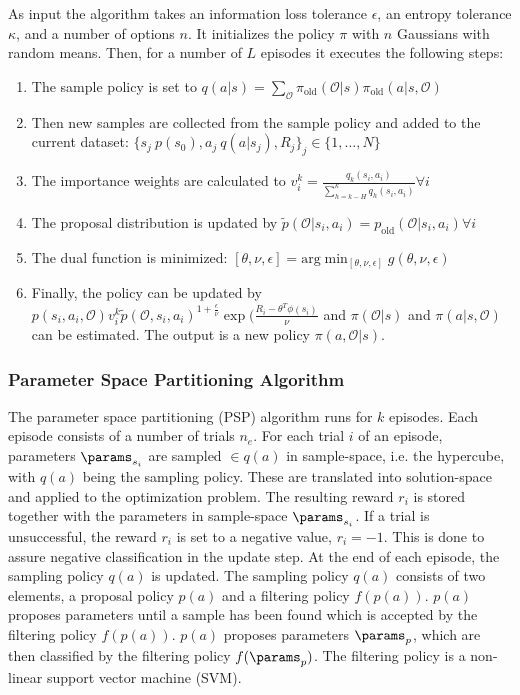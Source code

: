 As input the algorithm takes an information loss tolerance $\epsilon$, an entropy tolerance $\kappa$, and a number of options $n$.
It initializes the policy $\pi$ with $n$ Gaussians with random means.
Then, for a number of $L$ episodes it executes the following steps:
\begin{enumerate}
\item The sample policy is set to $q(a|s)=\sum_\mathcal{O} \pi_\text{old}(\mathcal{O}|s)\pi_\text{old}(a|s,\mathcal{O})$
\item Then new samples are collected from the sample policy and added to the current dataset: $\{s_j ~ p(s_0),a_j~q(a|s_j),R_j\}_j\in \{1,\dots,N\}$
\item The importance weights are calculated to $v_i^k=\frac{q_k(s_i,a_i)}{\sum_{h=k-H}^k q_h(s_i,a_i)} \forall i$
\item The proposal distribution is updated by $\tilde{p}(\mathcal{O}|s_i,a_i)=p_\text{old}(\mathcal{O}|s_i,a_i) \forall i$
\item The dual function is minimized: $[\theta,\nu,\epsilon]=\text{arg} \min_{[\theta,\nu,\epsilon]} g(\theta,\nu,\epsilon)$
\item Finally, the policy can be updated by $p(s_i,a_i,\mathcal{O}) v_i^k \tilde{p}(\mathcal{O},s_i,a_i)^{1+\frac{\epsilon}{\nu}} \exp(\frac{R_i-\theta^T \phi(s_i)}{\nu}$ and $\pi(\mathcal{O}|s)$ and $\pi(a|s,\mathcal{O})$ can be estimated.
The output is a new policy $\pi(a,\mathcal{O}|s)$.
\end{enumerate}

\subsubsection{Parameter Space Partitioning Algorithm}

The parameter space partitioning (PSP) algorithm \cite{Voigt.2021} runs for $k$ episodes.
Each episode consists of a number of trials $n_e$.
For each trial $i$ of an episode, parameters $\params_{s_i}$ are sampled $\in q(a)$
in sample-space, i.e. the hypercube, with $q(a)$ being the sampling policy.
These are translated into solution-space and applied to the optimization problem.
The resulting reward $r_i$ is stored together with the parameters in sample-space $\params_{s_i}$.
If a trial is unsuccessful, the reward $r_i$ is set to a negative value, $r_i = -1$.
This is done to assure negative classification in the update step.
At the end of each episode, the sampling policy $q(a)$ is updated.
The sampling policy $q(a)$ consists of two elements, a proposal policy $p(a)$ and a filtering policy $f(p(a))$.
$p(a)$ proposes parameters until a sample has been found which is accepted by the filtering policy $f(p(a))$.
$p(a)$ proposes parameters $\params_p$, which are then classified by the filtering policy $f(\params_p)$.
The filtering policy is a non-linear support vector machine (SVM).

